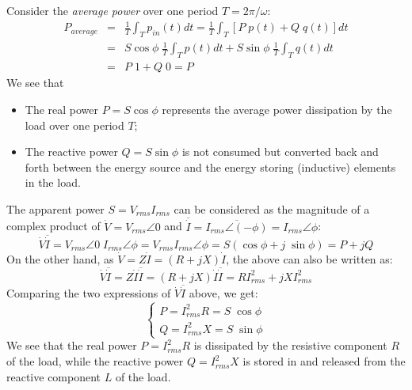 \documentclass{article}
\begin{document}
Consider the {\em average power} over one period $T=2\pi/\omega$:
\begin{eqnarray}
  P_{average}&=&\frac{1}{T}\int_T p_{in}(t)dt
  =\frac{1}{T}\int_T  \left[P\; p(t) + Q\; q(t) \right] dt
  \nonumber \\
  &=&S\cos\phi\;\frac{1}{T}\int_T p(t)dt+S\sin\phi\;\frac{1}{T}\int_T q(t)dt
  \nonumber \\
  &=&P\;1+Q\;0=P 
\end{eqnarray}
We see that
\begin{itemize}
\item The real power $P=S\cos\phi$ represents the average power dissipation 
  by the load over one period $T$;
\item The reactive power $Q=S\sin\phi$ is not consumed but converted back 
  and forth between the energy source and the energy storing (inductive)
  elements in the load.
\end{itemize}

The apparent power $S=V_{rms}I_{rms}$ can be considered as the magnitude of 
a complex product of $\dot{V}=V_{rms}\angle 0$ and 
$\overline{\dot{I}}=\overline{I_{rms}\angle(-\phi)}=I_{rms}\angle\phi$:
\begin{equation}
  \dot{V}\overline{\dot{I}}=V_{rms}\angle 0\; I_{rms}\angle \phi=V_{rms}I_{rms}\angle \phi
  =S(\cos\phi+j\;\sin\phi)=P+jQ	
\end{equation}
On the other hand, as $\dot{V}=Z\dot{I}=(R+jX)\dot{I}$, the above can 
also be written as:
\begin{equation}
  \dot{V}\overline{\dot{I}}=Z\dot{I}\overline{\dot{I}}
  =(R+jX)\dot{I}\overline{\dot{I}}=RI^2_{rms}+jX I^2_{rms}	
\end{equation}
Comparing the two expressions of $\dot{V}\overline{\dot{I}}$ above, we get:
\begin{equation} 
  \left\{ \begin{array}{l}P=I^2_{rms}R=S\;\cos\phi \\
    Q=I^2_{rms}X=S\;\sin\phi \end{array} \right. 
\end{equation}
We see that the real power $P=I^2_{rms}R$ is dissipated by the resistive
component $R$ of the load, while the reactive power $Q=I^2_{rms}X$ is stored 
in and released from the reactive component $L$ of the load. 


\end{document}
